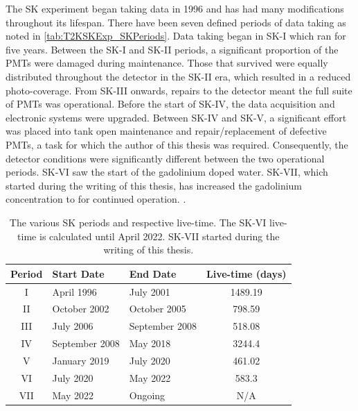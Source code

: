 The SK experiment began taking data in 1996 \cite{Fukuda1998-tw} and has had many modifications throughout its lifespan. There have been seven defined periods of data taking as noted in \autoref{tab:T2KSKExp_SKPeriods}. Data taking began in SK-I which ran for five years. Between the SK-I and SK-II periods, a significant proportion of the PMTs were damaged during maintenance. Those that survived were equally distributed throughout the detector in the SK-II era, which resulted in a reduced photo-coverage. From SK-III onwards, repairs to the detector meant the full suite of PMTs was operational. Before the start of SK-IV, the data acquisition and electronic systems were upgraded. Between SK-IV and SK-V, a significant effort was placed into tank open maintenance and repair/replacement of defective PMTs, a task for which the author of this thesis was required. Consequently, the detector conditions were significantly different between the two operational periods. SK-VI saw the start of the  gadolinium doped water. SK-VII, which started during the writing of this thesis, has increased the gadolinium concentration to  for continued operation. .


\begin{table}[ht!]
    \centering
    \begin{tabular}{c|l|l|c}
      \hline
      Period & Start Date & End Date & Live-time (days) \\
      \hline
      I & April 1996 & July 2001 & 1489.19 \\
      II & October 2002 & October 2005 & 798.59 \\
      III & July 2006 & September 2008 & 518.08 \\
      IV & September 2008 & May 2018 & 3244.4 \\
      V & January 2019 & July 2020 & 461.02 \\
      VI & July 2020 & May 2022 & 583.3 \\
      VII & May 2022 & Ongoing & N/A \\
      \hline 
      \hline
    \end{tabular}
    \caption{The various SK periods and respective live-time. The SK-VI live-time is calculated until  April 2022. SK-VII started during the writing of this thesis.}
    \label{tab:T2KSKExp_SKPeriods}
\end{table}

